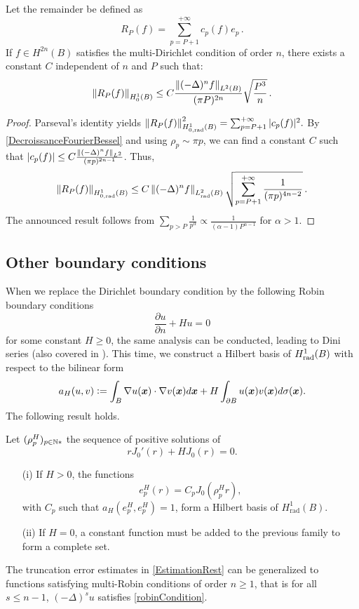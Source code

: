 \documentclass[main]{subfiles}
\begin{document}
\begin{corollary} Let the remainder be defined as 
	\[R_P(f) = \displaystyle\sum_{p = P+1}^{+\infty} c_{p}(f) e_{p}\,.\]
	If $f \in H^{2n}(B)$ satisfies the multi-Dirichlet condition of order $n$, there exists a constant $C$ independent of $n$ and $P$ such that: 
	\[\left\|R_P(f)\right\|_{H^1_0(B)} \leq C\dfrac{\left\|(-\Delta)^n f\right\|_{L^2(B)}}{(\pi P)^{2n}}\sqrt{\dfrac{P^3}{n}}\,.\]
	\label{EstimationRest}
\end{corollary}																												
\begin{proof}
	Parseval's identity yields $\left\|R_P(f)\right\|_{H^1_{0,\textup{rad}}(B)}^2 = \sum_{p=P+1}^{+\infty}|c_p(f)|^2.$
	By \autoref{DecroissanceFourierBessel} and using $\rho_p \sim \pi p$, we can find a constant $C$ such that $\left\lvert c_p(f) \right\rvert \leq C \frac{\left\|(-\Delta)^n f\right\|_{L^2}}{(\pi p)^{2n - 1}}$. Thus, 
	\[\left\|R_P(f)\right\|_{H^1_{0,\textup{rad}}(B)} \leq C \left\|(-\Delta)^n f\right\|_{L^2_{\textup{rad}}(B)}\sqrt{\sum_{p= P+1}^{+\infty} \dfrac{1}{(\pi p)^{4n-2}}}\,.\]
	The announced result follows from $\displaystyle\sum_{p > P} \frac{1}{p^{\alpha}} \propto \frac{1}{(\alpha - 1)P^{\alpha-1}}$ for $\alpha > 1$. 
\end{proof}


\subsection{Other boundary conditions}
\label{Robin}
When we replace the Dirichlet boundary condition by the following Robin boundary conditions
\begin{equation}
\label{robinCondition}
\dfrac{\partial u}{\partial n} + H u = 0
\end{equation}
for some constant $H \geq 0$, the same analysis can be conducted, leading to Dini series (also covered in \cite{watson1995treatise}). This time, we construct a Hilbert basis of $H^1_{\textup{rad}}(B)$ with respect to the bilinear form
\[a_H(u,v) \mathrel{\mathop:}= \int_{B} \nabla u(\boldsymbol{x} ) \cdot \nabla v(\boldsymbol{x} ) d\boldsymbol{x} + H \int_{\partial B}{u(\boldsymbol{x} )v(\boldsymbol{x} )}d\sigma(\boldsymbol{x} ).\]
The following result holds. 
\begin{theorem}
	Let $(\rho_p^H)_{p \in \mathbb{N}*}$ the sequence of positive solutions of
	\[r J_0'(r) + H J_0(r) = 0.\]
	\begin{itemize}
		\item[(i)] If $H>0$, the functions 
		\[e_p^H(r) = C_p J_0(\rho_p^H r),\]
		with $C_p$ such that $a_H(e_p^H,e_p^H) = 1$, form a Hilbert basis of $H^1_{\text{rad}}(B)$. 
		\item[(ii)]If $H = 0$, a constant function must be added to the previous family to form a complete set. 
	\end{itemize}
\end{theorem}
\noindent The truncation error estimates in \autoref{EstimationRest} can be generalized to functions satisfying multi-Robin conditions of order $n \geq 1$, that is for all $s\leq n-1$, $(-\Delta)^s u$ satisfies \eqref{robinCondition}.
\end{document}
